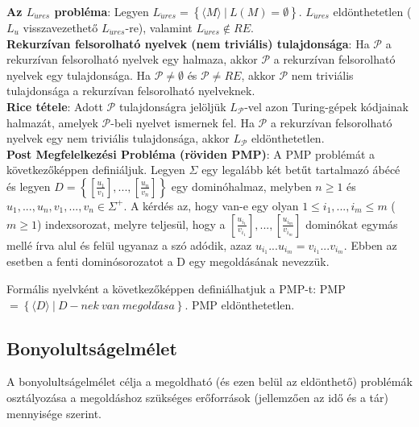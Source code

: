 \documentclass[margin=0px]{article}
\begin{document}
	\noindent \textbf{Az $L_{\ddot{u}res}$ probléma}: Legyen $L_{\ddot{u}res} = \left\{\langle M \rangle \ |\ L(M) = \emptyset \right\}$.
	$L_{\ddot{u}res}$ eldönthetetlen ($L_{u}$ visszavezethető $L_{\ddot{u}res}$-re), valamint $L_{\ddot{u}res} \notin RE$.\\
	
	\noindent \textbf{Rekurzívan felsorolható nyelvek (nem triviális) tulajdonsága}: Ha $\mathcal{P}$ a rekurzívan felsorolható
	nyelvek egy halmaza, akkor $\mathcal{P}$ a rekurzívan felsorolható nyelvek egy tulajdonsága. Ha $\mathcal{P} \not = \emptyset$ és
	$\mathcal{P} \not = RE$, akkor $\mathcal{P}$ nem triviális tulajdonsága a rekurzívan felsorolható nyelveknek.\\
	
	\noindent \textbf{Rice tétele}: 
	Adott $\mathcal{P}$ tulajdonságra jelöljük $L_{\mathcal{P}}$-vel azon Turing-gépek kódjainak halmazát, amelyek
	$\mathcal{P}$-beli nyelvet ismernek fel. Ha $\mathcal{P}$ a rekurzívan felsorolható nyelvek egy nem triviális tulajdonsága, akkor
	$L_{\mathcal{P}}$ eldönthetetlen.\\
	
	\noindent \textbf{Post Megfelelkezési Probléma (röviden PMP)}: A PMP problémát a következőképpen definiáljuk. Legyen
	$\Sigma$ egy legalább két betűt tartalmazó ábécé és legyen $D = \left\{[\frac{u_{1}}{v_{1}}], ..., [\frac{u_{n}}{v_{n}}]\right\}$
	egy dominóhalmaz, melyben $n \geq 1$ és $u_{1}, ..., u_{n}, v_{1}, ..., v_{n} \in \Sigma^{+}$. A kérdés az,	hogy van-e egy olyan
	$1 \leq i_{1}, ..., i_{m} \leq m$ ($m \geq 1$) indexsorozat, melyre teljesül, hogy a $[\frac{u_{i_{1}}}{v_{i_{1}}}], ..., [\frac{u_{i_{m}}}{v_{i_{m}}}]$ dominókat egymás mellé írva alul és felül ugyanaz a szó adódik, azaz
	$u_{i_{1}} ... u_{i_{m}} = v_{i_{1}} ... v_{i_{m}}$. Ebben az esetben a fenti dominósorozatot a D egy megoldásának nevezzük.
	
	Formális nyelvként a következőképpen definiálhatjuk a PMP-t:
	PMP $= \left\{ \langle D \rangle \ |\ D-nek \ van \ megold\acute{a}sa \right\}$. PMP eldönthetetlen.
		
	\subsection{Bonyolultságelmélet}
	
	A bonyolultságelmélet célja a megoldható (és ezen belül az eldönthető) problémák osztályozása a megoldáshoz szükséges
	erőforrások (jellemzően az idő és a tár) mennyisége szerint.
	
\end{document}
